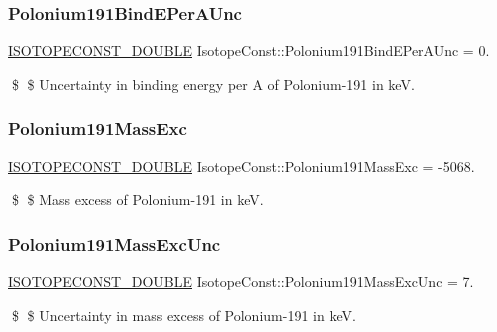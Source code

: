 \subsubsection{\texorpdfstring{Polonium191\+Bind\+E\+Per\+A\+Unc}{Polonium191BindEPerAUnc}}
{\footnotesize\ttfamily \mbox{\hyperlink{group___isotope_const-_macros_ga8f45a7272ce02c0b4c65c44636ed719a}{I\+S\+O\+T\+O\+P\+E\+C\+O\+N\+S\+T\+\_\+\+D\+O\+U\+B\+LE}} Isotope\+Const\+::\+Polonium191\+Bind\+E\+Per\+A\+Unc = 0.}

\$ \$ Uncertainty in binding energy per A of Polonium-\/191 in keV. \mbox{\label{group___isotope_const-_polonium-_po191_ga2b3ed04e3fd2b86d492d7d3811348425}} 
\subsubsection{\texorpdfstring{Polonium191\+Mass\+Exc}{Polonium191MassExc}}
{\footnotesize\ttfamily \mbox{\hyperlink{group___isotope_const-_macros_ga8f45a7272ce02c0b4c65c44636ed719a}{I\+S\+O\+T\+O\+P\+E\+C\+O\+N\+S\+T\+\_\+\+D\+O\+U\+B\+LE}} Isotope\+Const\+::\+Polonium191\+Mass\+Exc = -\/5068.}

\$ \$ Mass excess of Polonium-\/191 in keV. \mbox{\label{group___isotope_const-_polonium-_po191_ga2f8759c27abd3ee32c360d992f9af4c3}} 
\subsubsection{\texorpdfstring{Polonium191\+Mass\+Exc\+Unc}{Polonium191MassExcUnc}}
{\footnotesize\ttfamily \mbox{\hyperlink{group___isotope_const-_macros_ga8f45a7272ce02c0b4c65c44636ed719a}{I\+S\+O\+T\+O\+P\+E\+C\+O\+N\+S\+T\+\_\+\+D\+O\+U\+B\+LE}} Isotope\+Const\+::\+Polonium191\+Mass\+Exc\+Unc = 7.}

\$ \$ Uncertainty in mass excess of Polonium-\/191 in keV. \mbox{\label{group___isotope_const-_polonium-_po191_ga9fee1a521868d6b234327197aabccfcb}} 
